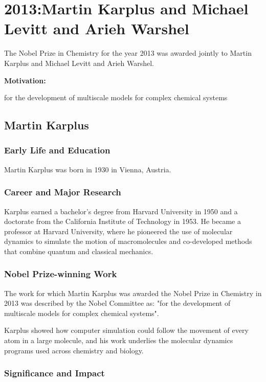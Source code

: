 \chapter{2013:Martin Karplus and Michael Levitt and Arieh Warshel}

\label{chap:chemistry2013}

The Nobel Prize in Chemistry for the year 2013 was awarded jointly to Martin Karplus and Michael Levitt and Arieh Warshel.

\textbf{Motivation:}

for the development of multiscale models for complex chemical systems

\section{Martin Karplus}

\subsection*{Early Life and Education}

Martin Karplus was born in 1930 in Vienna, Austria.

\subsection*{Career and Major Research}

Karplus earned a bachelor's degree from Harvard University in 1950 and a doctorate from the California Institute of Technology in 1953. He became a professor at Harvard University, where he pioneered the use of molecular dynamics to simulate the motion of macromolecules and co-developed methods that combine quantum and classical mechanics.

\subsection*{Nobel Prize-winning Work}

The work for which Martin Karplus was awarded the Nobel Prize in Chemistry in 2013 was described by the Nobel Committee as: "for the development of multiscale models for complex chemical systems".

Karplus showed how computer simulation could follow the movement of every atom in a large molecule, and his work underlies the molecular dynamics programs used across chemistry and biology.

\subsection*{Significance and Impact}

